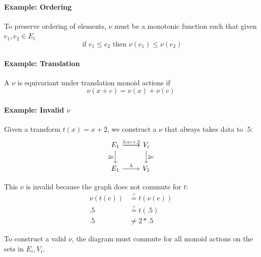 \documentclass[../main.tex]{subfiles}
\begin{document}
\paragraph{Example: Ordering}
To preserve ordering of elements, $\nu$ must be a monotonic function such that given $e_1, e_2 \in E_{i}$
\begin{equation}
\text{ if } e_1 \leq e_2 \text{ then } \nu(e_1) \leq \nu(e_2)
\end{equation}

\paragraph{Example: Translation}
A $\nu$ is equivariant under translation monoid actions if 
\begin{equation}
\nu(x + c) = \nu(x) + \nu(c)
\end{equation}


\paragraph{Example: Invalid $\nu$}
Given a transform $t(x) = x+2$, we construct a $\nu$ that always takes data to .5: 
\begin{equation}
    \label{eq:nu_equation_bad}
    \begin{tikzcd}
        E_1 \arrow[r] \arrow[r, "\lambda:e\mapsto.5"] \arrow[d, "2e"'] & V_i \arrow[d, "2v"] \\
        E_1 \arrow[r, "\lambda"]                                        & V_1                 
    \end{tikzcd}
\end{equation}

This $\nu$ is invalid because the graph does not commute for $t$:
\begin{align}
    \nu(t(e)) & \overset{?}{=} t(\nu(e))\\
    .5 & \overset{?}{=} t(.5)\\
    .5 & \neq 2*.5
\end{align}

To construct a valid $\nu$, the diagram must commute for all monoid actions on the sets in $E_i, V_i$.
\end{document}
